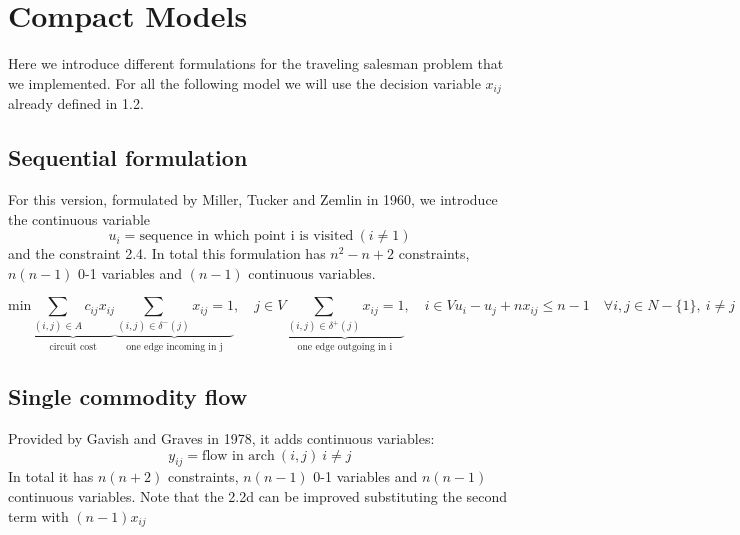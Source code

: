 \chapter{Compact Models}
Here we introduce different formulations for the traveling salesman problem that we implemented. For all the following model we will use the decision variable $x_{ij}$ already defined in 1.2.

\section{Sequential formulation}
For this version, formulated by Miller, Tucker and Zemlin in 1960, we introduce the continuous variable 
\begin{equation*}
	u_i = \text{sequence in which point i is visited} \ (i \neq 1)
\end{equation*}
and the constraint 2.4. In total this formulation has $n^2-n+2$ constraints, $n(n-1)$ 0-1 variables and $(n-1)$ continuous variables.

\begin{subequations}
	\begin{equation}
		\text{min} \underbrace{\sum_{(i,j) \in A} c_{ij}x_{ij}}_\text{circuit cost}
	\end{equation}
	\begin{equation}
		\underbrace{\sum_{(i,j) \in \delta^{-}(j)} x_{ij} = 1}_\text{one edge incoming in j}, \quad j \in V 
	\end{equation}
	\begin{equation}
		\underbrace{\sum_{(i,j) \in \delta^{+}(j)} x_{ij} = 1}_\text{one edge outgoing in i}, \quad i \in V
	\end{equation}
	\begin{equation}
		u_i-u_j+nx_{ij} \leq n-1 \quad \forall i,j \in N-\lbrace 1 \rbrace, \ i\neq j
	\end{equation}
\end{subequations}

\section{Single commodity flow}
Provided by Gavish and Graves in 1978, it adds continuous variables: 
\begin{equation*}
	y_{ij} = \text{flow in arch} \ (i,j) \ i \neq j
\end{equation*}
In total it has $n(n+2)$ constraints, $n(n-1)$ 0-1 variables and $n(n-1)$ continuous variables.
Note that the 2.2d can be improved substituting the second term with $(n-1)x_{ij}$


